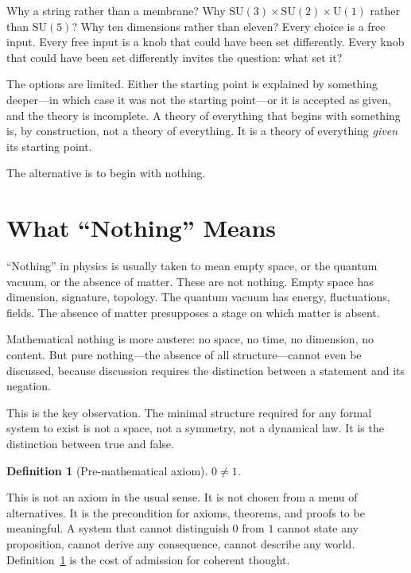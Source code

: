 \documentclass[11pt,a4paper]{article}
\newtheorem{definition}[theorem]{Definition}
\begin{document}
Why a string rather than a membrane? Why $\mathrm{SU}(3)\times
\mathrm{SU}(2)\times\mathrm{U}(1)$ rather than $\mathrm{SU}(5)$?
Why ten dimensions rather than eleven? Every choice is a free input.
Every free input is a knob that could have been set differently. Every
knob that could have been set differently invites the question: what
set it?

The options are limited. Either the starting point is explained by
something deeper---in which case it was not the starting point---or it
is accepted as given, and the theory is incomplete. A theory of
everything that begins with something is, by construction, not a
theory of everything. It is a theory of everything \emph{given} its
starting point.

The alternative is to begin with nothing.

\section{What ``Nothing'' Means}\label{sec:what-nothing-means}

``Nothing'' in physics is usually taken to mean empty space, or the
quantum vacuum, or the absence of matter. These are not nothing. Empty
space has dimension, signature, topology. The quantum vacuum has
energy, fluctuations, fields. The absence of matter presupposes a
stage on which matter is absent.

Mathematical nothing is more austere: no space, no time, no
dimension, no content. But pure nothing---the absence of all
structure---cannot even be discussed, because discussion requires
the distinction between a statement and its negation.

This is the key observation. The minimal structure required for any
formal system to exist is not a space, not a symmetry, not a
dynamical law. It is the distinction between true and false.

\begin{definition}[Pre-mathematical axiom]\label{def:axiom}
$0 \neq 1$.
\end{definition}

This is not an axiom in the usual sense. It is not chosen from a
menu of alternatives. It is the precondition for axioms, theorems,
and proofs to be meaningful. A system that cannot distinguish $0$
from $1$ cannot state any proposition, cannot derive any consequence,
cannot describe any world. Definition~\ref{def:axiom} is the cost of
admission for coherent thought.
\end{document}
